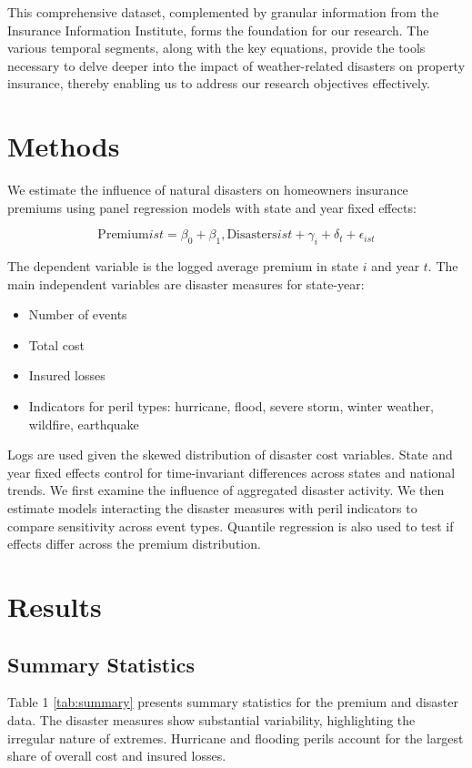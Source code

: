 \documentclass[12pt]{article}
\begin{document}
This comprehensive dataset, complemented by granular information from the Insurance Information Institute, forms the foundation for 
our research. The various temporal segments, along with the key equations, provide the tools necessary to delve deeper into the 
impact of weather-related disasters on property insurance, thereby enabling us to address our research objectives effectively. 



\section{Methods}
\label{sec:meth}
We estimate the influence of natural disasters on homeowners insurance premiums using panel regression models with state and year 
fixed effects:

\begin{equation} 
    \mathrm{Premium}{ist} = \beta_0 + \beta_1 , \mathrm{Disasters}{ist} + \gamma_i + \delta_t + \epsilon_{ist} 
\end{equation}

The dependent variable is the logged average premium in state $i$ and year $t$. The main independent variables are disaster measures 
for state-year:

\begin{itemize} 
    \item Number of events 
    \item Total cost 
    \item Insured losses 
    \item Indicators for peril types: hurricane, flood, severe storm, winter weather, wildfire, earthquake 
\end{itemize}

Logs are used given the skewed distribution of disaster cost variables. State and year fixed effects control for time-invariant 
differences across states and national trends. We first examine the influence of aggregated disaster activity. We then estimate 
models interacting the disaster measures with peril indicators to compare sensitivity across event types. Quantile regression is 
also used to test if effects differ across the premium distribution.



\section{Results}
\label{sec:resu}
\subsection{Summary Statistics}
Table 1 \ref{tab:summary} presents summary statistics for the premium and disaster data. The disaster measures show substantial variability, 
highlighting the irregular nature of extremes. Hurricane and flooding perils account for the largest share of overall cost and 
insured losses.
\end{document}
